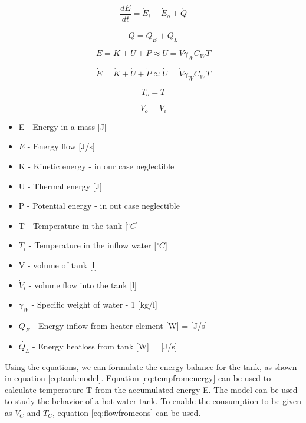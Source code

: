 \documentclass[11pt]{article} %
\begin{document}
\begin{equation} \label{eq:energybalance}
\frac{dE}{dt} = \dot{E}_i - \dot{E}_o + \dot{Q}
\end{equation}

\begin{equation} \label{eq:heattransfer}
\dot{Q} = \dot{Q}_E + \dot{Q}_L
\end{equation}

\begin{equation} \label{eq:energybymass}
E = K + U + P \approx U = V \gamma _W C_W T
\end{equation}

\begin{equation} \label{eq:energybymasstime}
\dot{E} = \dot{K} + \dot{U} + \dot{P} \approx \dot{U} = \dot{V} \gamma _W C_W T
\end{equation}

\begin{equation} \label{eq:tempout}
T_o = T
\end{equation}

\begin{equation} \label{eq:volumeflow}
V_o = V_i
\end{equation}


\begin{itemize}
	\item E - Energy in a mass [J]
	\item $\dot{E}$ - Energy flow [J/s]
	\item K - Kinetic energy - in our case neglectible
	\item U - Thermal energy [J]
	\item P - Potential energy - in out case neglectible
	\item T - Temperature in the tank [$^{\circ}C$]
	\item $T_i$ - Temperature in the inflow water [$^{\circ}C$]
	\item V - volume of tank [l]
	\item $ \dot{V} _i$ - volume flow into the tank [l]
	\item $\gamma _W$ - Specific weight of water - 1 [kg/l]
	\item $\dot{Q_E}$ - Energy inflow from heater element [W] = [J/s]
	\item $\dot{Q_L}$ - Energy heatloss from tank [W] = [J/s]
\end{itemize}

Using the equations, we can formulate the energy balance for the tank, as shown in equation \ref{eq:tankmodel}. Equation \ref{eq:tempfromenergy} can be used to calculate temperature T from the accumulated energy E. The model can be used to study the behavior of a hot water tank. To enable the consumption to be given as $\dot{V} _C$ and $T_C$, equation \ref{eq:flowfromcons} can be used.
\end{document}
